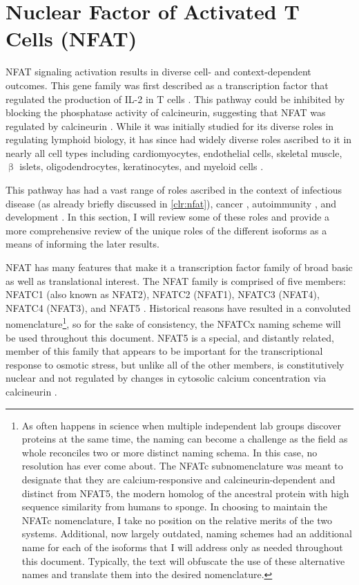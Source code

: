 \section{Nuclear Factor of Activated T Cells (NFAT)}\label{NFAT}

NFAT signaling activation results in diverse cell\hyp{} and context\hyp{}dependent outcomes. This gene family was first described as a transcription factor that regulated the production of IL\hyp{}2 in T cells \citep{Shaw1988, Jain1993, Northrop1994}. This pathway could be inhibited by blocking the phosphatase activity of calcineurin, suggesting that NFAT was regulated by calcineurin \citep{Jain1993, Loh1996}. While it was initially studied for its diverse roles in regulating lymphoid biology, it has since had widely diverse roles ascribed to it in nearly all cell types including cardiomyocytes, endothelial cells, skeletal muscle, $\upbeta$ islets, oligodendrocytes, keratinocytes, and myeloid cells \citep{Horsley2002, Crabtree2002, Fric2012b, Kegley2001, Stevenson2001, Weider2018, AlDaraji2002, Muller2010}. 

This pathway has had a vast range of roles ascribed in the context of infectious disease (as already briefly discussed in \autoref{clr:nfat}), cancer \citep{Muller2010}, autoimmunity \citep{Park2020}, and development \citep{Horsley2002, Crabtree2002}. In this section, I will review some of these roles and provide a more comprehensive review of the unique roles of the different isoforms as a means of informing the later results. 

NFAT has many features that make it a transcription factor family of broad basic as well as translational interest. The NFAT family is comprised of five members: NFATC1 (also known as NFAT2), NFATC2 (NFAT1), NFATC3 (NFAT4), NFATC4 (NFAT3), and NFAT5 \citep{Rao1997}. Historical reasons have resulted in a convoluted nomenclature\footnote{As often happens in science when multiple independent lab groups discover proteins at the same time, the naming can become a challenge as the field as whole reconciles two or more distinct naming schema. In this case, no resolution has ever come about. The NFATc subnomenclature was meant to designate that they are calcium\hyp{}responsive and calcineurin\hyp{}dependent and distinct from NFAT5, the modern homolog of the ancestral protein with high sequence similarity from humans to sponge. In choosing to maintain the NFATc nomenclature, I take no position on the relative merits of the two systems. Additional, now largely outdated, naming schemes had an additional name for each of the isoforms that I will address only as needed throughout this document. Typically, the text will obfuscate the use of these alternative names and translate them into the desired nomenclature.}, so for the sake of consistency, the NFATCx naming scheme will be used throughout this document. NFAT5 is a special, and distantly related, member of this family that appears to be important for the transcriptional response to osmotic stress, but unlike all of the other members, is constitutively nuclear and not regulated by changes in cytosolic calcium concentration via calcineurin \citep{Go2004, Kumar2020a}.

